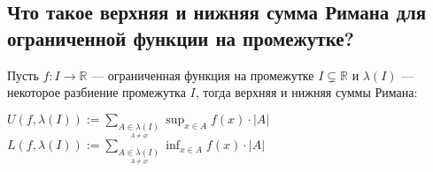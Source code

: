 \documentclass[a4paper]{article}
\begin{document}
\subsection{Что такое верхняя и нижняя сумма Римана для ограниченной функции на промежутке?}
Пусть $f: I \to \mathbb{R}$ — ограниченная функция на промежутке $I \subsetneq \mathbb{R}$ и $\lambda(I)$ — некоторое разбиение промежутка $I$, тогда верхняя и нижняя суммы Римана:
\begin{center}
    $U(f,\lambda(I)):=\displaystyle\sum_{\underset{A\ne\varnothing}{ A\in\lambda(I)}} \sup_{x\in A} f(x)\cdot\left|A\right|$\\[2mm]
    $L(f,\lambda(I)):=\displaystyle\sum_{\underset{A\ne\varnothing}{ A\in\lambda(I)}} \inf_{x\in A} f(x)\cdot\left|A\right|$
\end{center}


\end{document}
